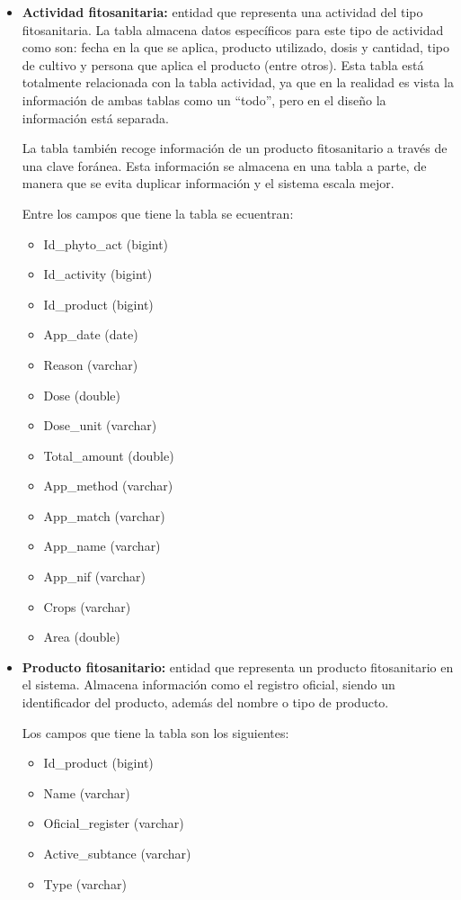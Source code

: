 \begin{itemize}
    \item \textbf{Actividad fitosanitaria:} entidad que representa una actividad del tipo fitosanitaria. La tabla almacena datos específicos para este tipo de actividad como son: fecha en la
    que se aplica, producto utilizado, dosis y cantidad, tipo de cultivo y persona que aplica el producto (entre otros). Esta tabla está totalmente relacionada con la tabla actividad, ya que en
    la realidad es vista la información de ambas tablas como un ``todo'', pero en el diseño la información está separada.

    La tabla también recoge información de un producto fitosanitario a través de una clave foránea. Esta información se almacena en una tabla a parte, de manera que se evita duplicar información
    y el sistema escala mejor.

    Entre los campos que tiene la tabla se ecuentran:

    \begin{itemize}
        \item Id\_phyto\_act (bigint)
        \item Id\_activity (bigint)
        \item Id\_product (bigint)
        \item App\_date (date)
        \item Reason (varchar)
        \item Dose (double)
        \item Dose\_unit (varchar)
        \item Total\_amount (double)
        \item App\_method (varchar)
        \item App\_match (varchar)
        \item App\_name (varchar)
        \item App\_nif (varchar)
        \item Crops (varchar)
        \item Area (double)
    \end{itemize}

    \item \textbf{Producto fitosanitario:} entidad que representa un producto fitosanitario en el sistema. Almacena información como el registro oficial, siendo un identificador del producto, 
    además del nombre o tipo de producto.

    Los campos que tiene la tabla son los siguientes:
    
    \begin{itemize}
        \item Id\_product (bigint)
        \item Name (varchar)
        \item Oficial\_register (varchar)
        \item Active\_subtance (varchar)
        \item Type (varchar)
    \end{itemize}
\end{itemize}

